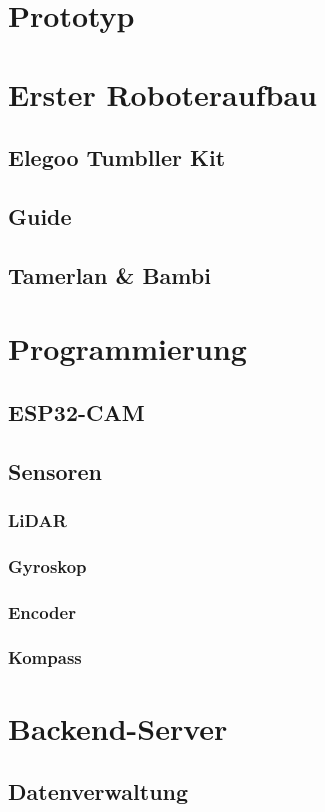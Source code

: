 \documentclass[12pt]{article}
\begin{document}
	\section{Prototyp}
	\section{Erster Roboteraufbau}
	\subsection{Elegoo Tumbller Kit}
	\subsection{Guide}
	\subsection{Tamerlan \& Bambi}
	\section{Programmierung}
	\subsection{ESP32-CAM}
	\subsection{Sensoren}
	\subsubsection{LiDAR}
	\subsubsection{Gyroskop}
	\subsubsection{Encoder}
	\subsubsection{Kompass}
	\section{Backend-Server}
	\subsection{Datenverwaltung}
\end{document}
